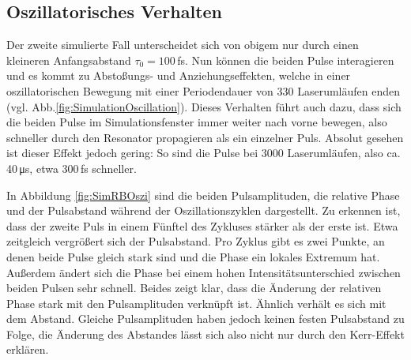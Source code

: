 \documentclass[bachelor,       %
               twoside,        %
               BCOR10mm,       %
               liststotoc,nomtotoc,bibtotoc, %
               english,ngerman, %
               final,          %
               ]{GAUBM}
\begin{document}
\subsection{Oszillatorisches Verhalten}
Der zweite simulierte Fall unterscheidet sich von obigem nur durch einen kleineren Anfangsabstand $\tau_0=100\,$fs.
Nun können die beiden Pulse interagieren und es kommt zu Abstoßungs- und Anziehungseffekten, welche in einer oszillatorischen Bewegung mit einer Periodendauer von 330 Laserumläufen enden (vgl. Abb.\ref{fig:SimulationOscillation}).
Dieses Verhalten führt auch dazu, dass sich die beiden Pulse im Simulationsfenster immer weiter nach vorne bewegen, also schneller durch den Resonator propagieren als  ein einzelner Puls.
Absolut gesehen ist dieser Effekt jedoch gering: So sind die Pulse bei 3000 Laserumläufen, also ca. 40\,\si{\micro\second}, etwa 300\,fs schneller.

In Abbildung \ref{fig:SimRBOszi} sind die beiden Pulsamplituden, die relative Phase und der Pulsabstand während der Oszillationszyklen dargestellt.
Zu erkennen ist, dass der zweite Puls in einem Fünftel des Zykluses stärker als der erste ist.
Etwa zeitgleich vergrößert sich der Pulsabstand.
Pro Zyklus gibt es zwei Punkte, an denen beide Pulse gleich stark sind und die Phase ein lokales Extremum hat.
Außerdem ändert sich die Phase bei einem hohen Intensitätsunterschied zwischen beiden Pulsen sehr schnell.
Beides zeigt klar, dass die Änderung der relativen Phase stark mit den Pulsamplituden verknüpft ist.
Ähnlich verhält es sich mit dem Abstand.
Gleiche Pulsamplituden haben jedoch keinen festen Pulsabstand zu Folge, die Änderung des Abstandes lässt sich also nicht nur durch den Kerr-Effekt erklären.
\end{document}
